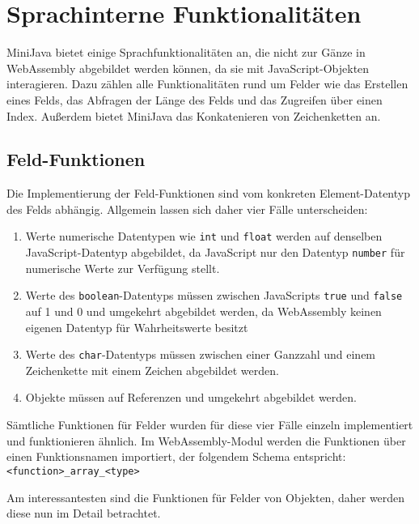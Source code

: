 \section{Sprachinterne Funktionalitäten}
\label{sec:Sprachinterne-Funktionalitäten}

MiniJava bietet einige Sprachfunktionalitäten an, die nicht zur Gänze in WebAssembly abgebildet werden können, da sie mit JavaScript-Objekten interagieren. Dazu zählen alle Funktionalitäten rund um Felder wie das Erstellen eines Felds, das Abfragen der Länge des Felds und das Zugreifen über einen Index. Außerdem bietet MiniJava das Konkatenieren von Zeichenketten an.

\subsection{Feld-Funktionen}
\label{subsec:Feld-Funktionen}

Die Implementierung der Feld-Funktionen sind vom konkreten Element-Datentyp des Felds abhängig. Allgemein lassen sich daher vier Fälle unterscheiden:

\begin{enumerate}
    \item Werte numerische Datentypen wie \lstinline{int} und \lstinline{float} werden auf denselben JavaScript-Daten\-typ abgebildet, da JavaScript nur den Datentyp \lstinline{number} für numerische Werte zur Verfügung stellt.
    \item Werte des \lstinline{boolean}-Datentyps müssen zwischen JavaScripts \lstinline{true} und \lstinline{false} auf 1 und 0 und umgekehrt abgebildet werden, da WebAssembly keinen eigenen Datentyp für Wahrheitswerte besitzt
    \item Werte des \lstinline{char}-Datentyps müssen zwischen einer Ganzzahl und einem Zeichenkette mit einem Zeichen abgebildet werden.
    \item Objekte  müssen auf Referenzen und umgekehrt abgebildet werden. 
\end{enumerate}

Sämtliche Funktionen für Felder wurden für diese vier Fälle einzeln implementiert und funktionieren ähnlich. Im WebAssembly-Modul werden die Funktionen über einen Funktionsnamen importiert, der folgendem Schema entspricht: \\
\lstinline{<function>_array_<type>}

Am interessantesten sind die Funktionen für Felder von Objekten, daher werden diese nun im Detail betrachtet.

